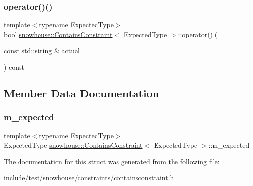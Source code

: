 \mbox{\label{structsnowhouse_1_1ContainsConstraint_acc3f33607111c0145dde4b8aef55b80a}} 
\subsubsection{\texorpdfstring{operator()()}{operator()()}\hspace{0.1cm}{\footnotesize\ttfamily [2/2]}}
{\footnotesize\ttfamily template$<$typename Expected\+Type$>$ \\
bool \mbox{\hyperlink{structsnowhouse_1_1ContainsConstraint}{snowhouse\+::\+Contains\+Constraint}}$<$ Expected\+Type $>$\+::operator() (\begin{DoxyParamCaption}\item[{const std\+::string \&}]{actual }\end{DoxyParamCaption}) const\hspace{0.3cm}{\ttfamily [inline]}}



\subsection{Member Data Documentation}
\mbox{\label{structsnowhouse_1_1ContainsConstraint_a2012e122db77fc38ca3af0fc6bfb1915}} 
\subsubsection{\texorpdfstring{m\_expected}{m\_expected}}
{\footnotesize\ttfamily template$<$typename Expected\+Type$>$ \\
Expected\+Type \mbox{\hyperlink{structsnowhouse_1_1ContainsConstraint}{snowhouse\+::\+Contains\+Constraint}}$<$ Expected\+Type $>$\+::m\+\_\+expected}



The documentation for this struct was generated from the following file\+:\begin{DoxyCompactItemize}
\item 
include/test/snowhouse/constraints/\mbox{\hyperlink{containsconstraint_8h}{containsconstraint.\+h}}\end{DoxyCompactItemize}
